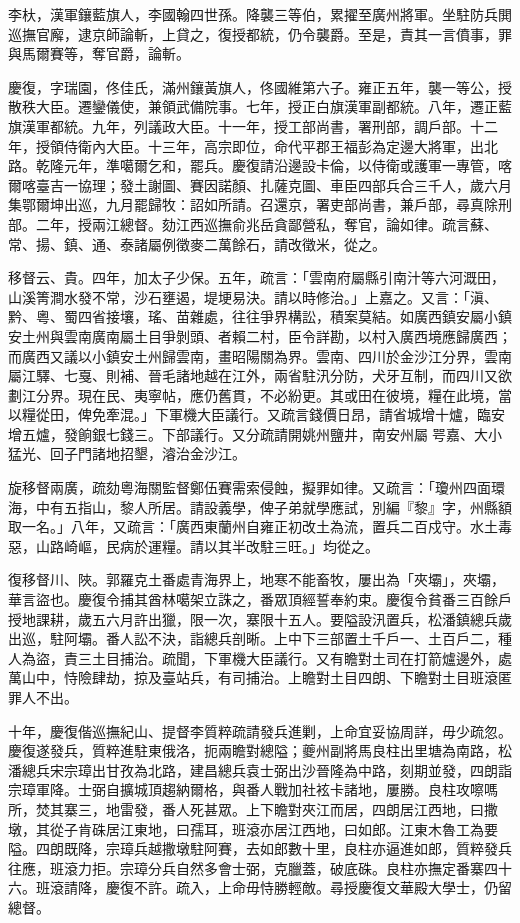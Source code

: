 \begin{pinyinscope}
李杕，漢軍鑲藍旗人，李國翰四世孫。降襲三等伯，累擢至廣州將軍。坐駐防兵閧巡撫官廨，逮京師論斬，上貸之，復授都統，仍令襲爵。至是，責其一言僨事，罪與馬爾賽等，奪官爵，論斬。

慶復，字瑞園，佟佳氏，滿州鑲黃旗人，佟國維第六子。雍正五年，襲一等公，授散秩大臣。遷鑾儀使，兼領武備院事。七年，授正白旗漢軍副都統。八年，遷正藍旗漢軍都統。九年，列議政大臣。十一年，授工部尚書，署刑部，調戶部。十二年，授領侍衛內大臣。十三年，高宗即位，命代平郡王福彭為定邊大將軍，出北路。乾隆元年，準噶爾乞和，罷兵。慶復請沿邊設卡倫，以侍衛或護軍一專管，喀爾喀臺吉一協理；發土謝圖、賽因諾顏、扎薩克圖、車臣四部兵合三千人，歲六月集鄂爾坤出巡，九月罷歸牧：詔如所請。召還京，署吏部尚書，兼戶部，尋真除刑部。二年，授兩江總督。劾江西巡撫俞兆岳貪鄙營私，奪官，論如律。疏言蘇、常、揚、鎮、通、泰諸屬例徵麥二萬餘石，請改徵米，從之。

移督云、貴。四年，加太子少保。五年，疏言：「雲南府屬縣引南汁等六河溉田，山溪箐澗水發不常，沙石壅遏，堤埂易決。請以時修治。」上嘉之。又言：「滇、黔、粵、蜀四省接壤，瑤、苗雜處，往往爭界構訟，積案莫結。如廣西鎮安屬小鎮安土州與雲南廣南屬土目爭剝頭、者賴二村，臣令詳勘，以村入廣西境應歸廣西；而廣西又議以小鎮安土州歸雲南，畫昭陽關為界。雲南、四川於金沙江分界，雲南屬江驛、七戛、則補、晉毛諸地越在江外，兩省駐汛分防，犬牙互制，而四川又欲劃江分界。現在民、夷寧帖，應仍舊貫，不必紛更。其或田在彼境，糧在此境，當以糧從田，俾免牽混。」下軍機大臣議行。又疏言錢價日昂，請省城增十爐，臨安增五爐，發餉銀七錢三。下部議行。又分疏請開姚州鹽井，南安州屬咢嘉、大小猛光、回子門諸地招墾，濬治金沙江。

旋移督兩廣，疏劾粵海關監督鄭伍賽需索侵蝕，擬罪如律。又疏言：「瓊州四面環海，中有五指山，黎人所居。請設義學，俾子弟就學應試，別編『黎』字，州縣額取一名。」八年，又疏言：「廣西東蘭州自雍正初改土為流，置兵二百戍守。水土毒惡，山路崎嶇，民病於運糧。請以其半改駐三旺。」均從之。

復移督川、陜。郭羅克土番處青海界上，地寒不能畜牧，屢出為「夾壩」，夾壩，華言盜也。慶復令捕其酋林噶架立誅之，番眾頂經誓奉約束。慶復令貧番三百餘戶授地課耕，歲五六月許出獵，限一次，寨限十五人。要隘設汛置兵，松潘鎮總兵歲出巡，駐阿壩。番人訟不決，詣總兵剖晰。上中下三部置土千戶一、土百戶二，種人為盜，責三土目捕治。疏聞，下軍機大臣議行。又有瞻對土司在打箭爐邊外，處萬山中，恃險肆劫，掠及臺站兵，有司捕治。上瞻對土目四朗、下瞻對土目班滾匿罪人不出。

十年，慶復偕巡撫紀山、提督李質粹疏請發兵進剿，上命宜妥協周詳，毋少疏忽。慶復遂發兵，質粹進駐東俄洛，扼兩瞻對總隘；夔州副將馬良柱出里塘為南路，松潘總兵宋宗璋出甘孜為北路，建昌總兵袁士弼出沙晉隆為中路，刻期並發，四朗詣宗璋軍降。士弼自擴城頂趨納爾格，與番人戰加社袨卡諸地，屢勝。良柱攻嚓嗎所，焚其寨三，地雷發，番人死甚眾。上下瞻對夾江而居，四朗居江西地，曰撒墩，其從子肯硃居江東地，曰孺耳，班滾亦居江西地，曰如郎。江東木魯工為要隘。四朗既降，宗璋兵越撒墩駐阿賽，去如郎數十里，良柱亦逼進如郎，質粹發兵往應，班滾力拒。宗璋分兵自然多會士弼，克臘蓋，破底硃。良柱亦撫定番寨四十六。班滾請降，慶復不許。疏入，上命毋恃勝輕敵。尋授慶復文華殿大學士，仍留總督。


\end{pinyinscope}
